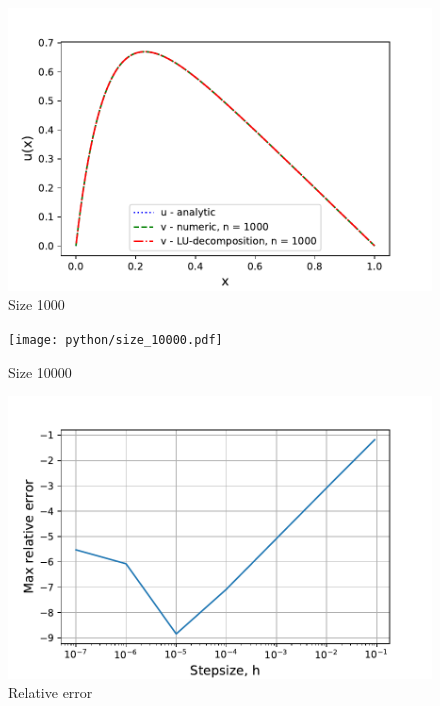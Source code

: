 \documentclass{article}
\begin{document}
\begin{figure}[h]
    \centering
    \includegraphics[width =12cm]{python/size_1000.pdf}
    \caption{Size 1000}
    \label{fig:3}
\end{figure}


\begin{figure}[h]
    \centering
    \texttt{[image: python/size\_10000.pdf]}
    \caption{Size 10000}
    \label{fig:4}
\end{figure}

\begin{figure}[h]
    \centering
    \includegraphics[width =12cm]{python/relative_error.pdf}
    \caption{Relative error}
    \label{fig:re}
\end{figure}
\end{document}
